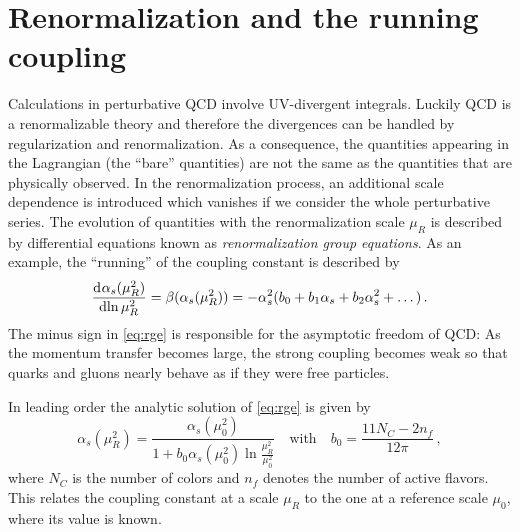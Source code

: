 \section{Renormalization and the running coupling}
Calculations in perturbative QCD involve UV-divergent integrals.
Luckily QCD is a renormalizable theory and therefore the divergences can be handled by regularization and renormalization.
As a consequence, the quantities appearing in the Lagrangian (the \enquote{bare} quantities) are not the same as the quantities that are physically observed.
In the renormalization process, an additional scale dependence is introduced which vanishes if we consider the whole perturbative series.
The evolution of quantities with the renormalization scale $\mu_R$ is described by differential equations known as \textit{renormalization group equations}.
As an example, the \enquote{running} of the coupling constant is described by
%
\begin{equation}
  \dod{ \alpha_{s} ( \mu_R^{2} ) }{ \ln{\mu_R^2} } = \beta(\alpha_s(\mu_R^2)) = - \alpha_s^2 (b_0 + b_1 \alpha_s + b_2 \alpha_s^2 + \dots) \, .
	\label{eq:rge}
\end{equation}
%
The minus sign in \cref{eq:rge} is responsible for the asymptotic freedom of QCD:
As the momentum transfer becomes large, the strong coupling becomes weak so that quarks and gluons nearly behave as if they were free particles.

In leading order the analytic solution of \cref{eq:rge} is given by
%
\begin{equation}
	\alpha_s(\mu_R^2) = \frac{\alpha_s(\mu_0^2)}{1 + b_0 \alpha_s(\mu_0^2) \ln \frac{\mu_R^2}{\mu_0^2}} \quad \text{with} \quad b_0=\frac{11 N_C - 2 n_f}{12 \pi} \, ,
\end{equation}
%
where $N_C$ is the number of colors and $n_f$ denotes the number of active flavors.
This relates the coupling constant at a scale $\mu_R$ to the one at a reference scale $\mu_0$, where its value is known.
%
